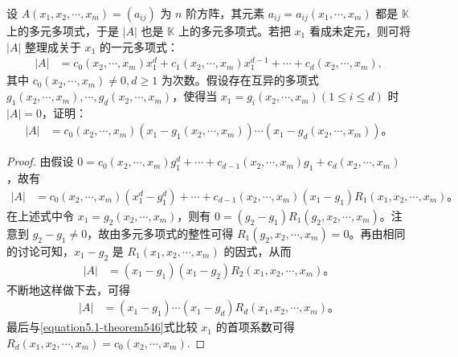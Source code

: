 \documentclass[../../main.tex]{subfiles}%
\begin{document}
\begin{theorem}[行列式的求根法]\label{theorem:行列式的求根法}
设 $A(x_1, x_2, \cdots, x_m) = (a_{ij})$ 为 $n$ 阶方阵，其元素 $a_{ij} = a_{ij}(x_1, \cdots, x_m)$ 都是 $\mathbb{K}$ 上的多元多项式，于是 $|A|$ 也是 $\mathbb{K}$ 上的多元多项式。若把 $x_1$ 看成未定元，则可将 $|A|$ 整理成关于 $x_1$ 的一元多项式：
\begin{align}
|A| &= c_0(x_2, \cdots, x_m)x_1^d + c_1(x_2, \cdots, x_m)x_1^{d-1} + \cdots + c_d(x_2, \cdots, x_m),\label{equation5.1-theorem546}
\end{align}
其中 $c_0(x_2, \cdots, x_m) \neq 0, d \geqslant  1$ 为次数。假设存在互异的多项式 $g_1(x_2, \cdots, x_m), \cdots, g_d(x_2, \cdots, x_m)$，使得当 $x_1 = g_i(x_2, \cdots, x_m) (1 \leqslant  i \leqslant  d)$ 时 $|A| = 0$，证明：
\begin{align*}
|A| &= c_0(x_2, \cdots, x_m)(x_1 - g_1(x_2, \cdots, x_m)) \cdots (x_1 - g_d(x_2, \cdots, x_m))。
\end{align*}
\end{theorem}
\begin{proof}

由假设 $0 = c_0(x_2, \cdots, x_m)g_1^d + \cdots + c_{d-1}(x_2, \cdots, x_m)g_1 + c_d(x_2, \cdots, x_m)$，故有
\begin{align*}
|A| &= c_0(x_2, \cdots, x_m)(x_1^d - g_1^d) + \cdots + c_{d-1}(x_2, \cdots, x_m)(x_1 - g_1)R_1(x_1, x_2, \cdots, x_m)。
\end{align*}
在上述式中令 $x_1 = g_2(x_2, \cdots, x_m)$，则有 $0 = (g_2 - g_1)R_1(g_2, x_2, \cdots, x_m)$。注意到 $g_2 - g_1 \neq 0$，故由多元多项式的整性可得 $R_1(g_2, x_2, \cdots, x_m) = 0$。再由相同的讨论可知，$x_1 - g_2$ 是 $R_1(x_1, x_2, \cdots, x_m)$ 的因式，从而
\begin{align*}
|A| &= (x_1 - g_1)(x_1 - g_2)R_2(x_1, x_2, \cdots, x_m)。
\end{align*}
不断地这样做下去，可得
\begin{align*}
|A| &= (x_1 - g_1) \cdots (x_1 - g_d)R_d(x_1, x_2, \cdots, x_m)。
\end{align*}
最后与\eqref{equation5.1-theorem546}式比较 $x_1$ 的首项系数可得 $R_d(x_1, x_2, \cdots, x_m) = c_0(x_2, \cdots, x_m)$.

\end{proof}
\end{document}
